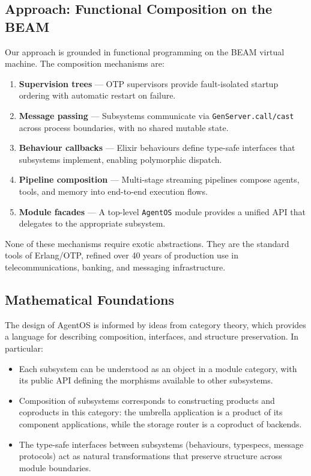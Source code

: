 \documentclass[12pt,a4paper]{article}
\theoremstyle{definition}
\begin{document}
\subsection{Approach: Functional Composition on the BEAM}

Our approach is grounded in functional programming on the BEAM virtual machine.
The composition mechanisms are:

\begin{enumerate}
  \item \textbf{Supervision trees} --- OTP supervisors provide fault-isolated startup
        ordering with automatic restart on failure.
  \item \textbf{Message passing} --- Subsystems communicate via \texttt{GenServer.call/cast}
        across process boundaries, with no shared mutable state.
  \item \textbf{Behaviour callbacks} --- Elixir behaviours define type-safe interfaces
        that subsystems implement, enabling polymorphic dispatch.
  \item \textbf{Pipeline composition} --- Multi-stage streaming pipelines compose
        agents, tools, and memory into end-to-end execution flows.
  \item \textbf{Module facades} --- A top-level \texttt{AgentOS} module provides a
        unified API that delegates to the appropriate subsystem.
\end{enumerate}

None of these mechanisms require exotic abstractions.
They are the standard tools of Erlang/OTP, refined over 40 years of production
use in telecommunications, banking, and messaging infrastructure.

\subsection{Mathematical Foundations}\label{subsec:math-foundations}

The design of AgentOS is informed by ideas from category theory, which provides
a language for describing composition, interfaces, and structure preservation.
In particular:

\begin{itemize}
  \item Each subsystem can be understood as an object in a module category, with
        its public API defining the morphisms available to other subsystems.
  \item Composition of subsystems corresponds to constructing products and coproducts
        in this category: the umbrella application is a product of its component
        applications, while the storage router is a coproduct of backends.
  \item The type-safe interfaces between subsystems (behaviours, typespecs, message
        protocols) act as natural transformations that preserve structure across
        module boundaries.
\end{itemize}
\end{document}
